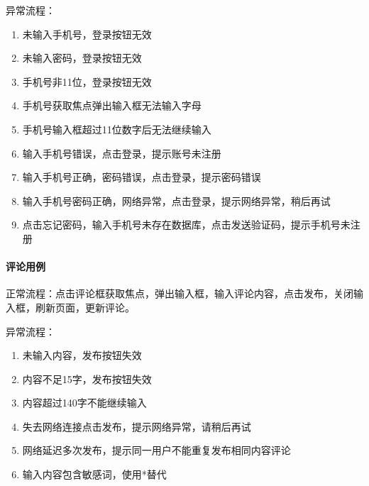 \documentclass[letterpaper,11pt,english]{sphinxmanual}
\begin{document}
异常流程：
\begin{enumerate}
%
\item {} 
未输入手机号，登录按钮无效

\item {} 
未输入密码，登录按钮无效

\item {} 
手机号非11位，登录按钮无效

\item {} 
手机号获取焦点弹出输入框无法输入字母

\item {} 
手机号输入框超过11位数字后无法继续输入

\item {} 
输入手机号错误，点击登录，提示账号未注册

\item {} 
输入手机号正确，密码错误，点击登录，提示密码错误

\item {} 
输入手机号密码正确，网络异常，点击登录，提示网络异常，稍后再试

\item {} 
点击忘记密码，输入手机号未存在数据库，点击发送验证码，提示手机号未注册

\end{enumerate}


\paragraph{评论用例}
\label{\detokenize{chapter_knowledge/service_analysis:id3}}
正常流程：点击评论框获取焦点，弹出输入框，输入评论内容，点击发布，关闭输入框，刷新页面，更新评论。

异常流程：
\begin{enumerate}
%
\item {} 
未输入内容，发布按钮失效

\item {} 
内容不足15字，发布按钮失效

\item {} 
内容超过140字不能继续输入

\item {} 
失去网络连接点击发布，提示网络异常，请稍后再试

\item {} 
网络延迟多次发布，提示同一用户不能重复发布相同内容评论

\item {} 
输入内容包含敏感词，使用*替代

\end{enumerate}
\end{document}
